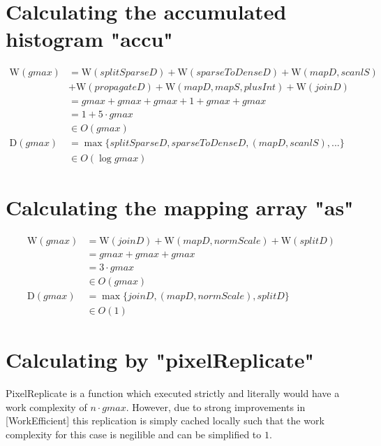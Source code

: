 \documentclass{article}
\newcommand{\W}[0]{\textrm{W}}
\newcommand{\D}[0]{\textrm{D}}
\begin{document}
    \section{Calculating the accumulated histogram "accu"}
      \begin{equation}
      \begin{split}
      \W(gmax)
            & = \W(splitSparseD) + \W(sparseToDenseD) + \W(mapD,scanlS) \\
            &     + \W(propagateD) + \W(mapD,mapS,plusInt) + \W(joinD) \\
            & = gmax + gmax + gmax + 1 + gmax + gmax\\
            & = 1 + 5 \cdot gmax \\
            & \in O(gmax) \\
      \D(gmax)
          & = \max \{ splitSparseD, sparseToDenseD, (mapD,scanlS),...\} \\
          & \in O(\log gmax)
      \end{split}
      \end{equation}
    
    \section{Calculating the mapping array "as"}
      \begin{equation}
      \begin{split}
      \W(gmax)
            & = \W(joinD) + \W(mapD,normScale) + \W(splitD) \\
            & = gmax + gmax + gmax \\
            & = 3 \cdot gmax \\
            & \in O(gmax) \\
      \D(gmax)
          & = \max \{ joinD,(mapD,normScale),splitD\} \\
          & \in O(1)
      \end{split}
      \end{equation}
      
    \section{Calculating by "pixelReplicate"}
      PixelReplicate is a function which executed strictly
      and literally would have a work complexity of $n \cdot gmax$.
      However, due to strong improvements in [WorkEfficient]
      this replication is simply cached locally such that
      the work complexity for this case is negilible and
      can be simplified to $1$.
      
\end{document}
